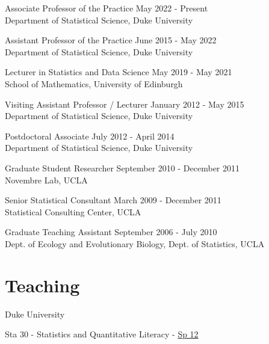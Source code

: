 \documentclass[margin,line]{res}
\begin{document}
\begin{resume}
Associate Professor of the Practice \hfill May 2022 - Present \\
{Department of Statistical Science}, Duke University \\
\vspace{-0.5cm}

Assistant Professor of the Practice \hfill June 2015 - May 2022 \\
{Department of Statistical Science}, Duke University \\
\vspace{-0.5cm}

Lecturer in Statistics and Data Science \hfill May 2019 - May 2021 \\
{School of Mathematics}, University of Edinburgh \\
\vspace{-0.5cm}

Visiting Assistant Professor / Lecturer  \hfill January 2012 - May 2015 \\
{Department of Statistical Science}, Duke University \\
\vspace{-0.5cm}

Postdoctoral Associate  \hfill July 2012 - April 2014 \\
{Department of Statistical Science}, Duke University \\
\vspace{-0.5cm}

Graduate Student Researcher \hfill September 2010 - December 2011 \\
{Novembre Lab}, UCLA \\
\vspace{-0.5cm}

Senior Statistical Consultant \hfill March 2009 - December 2011 \\
{Statistical Consulting Center}, UCLA \\
\vspace{-0.50cm}

Graduate Teaching Assistant \hfill September 2006 - July 2010 \\
{Dept. of Ecology and Evolutionary Biology, Dept. of Statistics}, UCLA \\


\section{\sc Teaching}


Duke University

\begin{list1}
\item[] Sta 30 - Statistics and Quantitative Literacy - \href{http://www2.stat.duke.edu/courses/Spring12/sta10.1/}{Sp 12}


\end{list1}
\end{resume}
\end{document}

